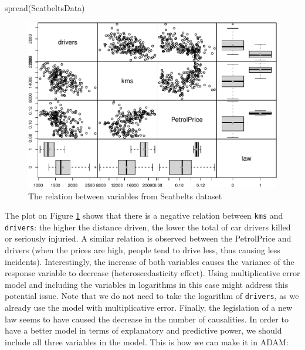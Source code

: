 \documentclass[
]{book}
\newenvironment{Shaded}{\begin{snugshade}}{\end{snugshade}}
\newcommand{\FunctionTok}[1]{\textcolor[rgb]{0.00,0.00,0.00}{#1}}
\newcommand{\NormalTok}[1]{#1}
\theoremstyle{definition}
\theoremstyle{definition}
\theoremstyle{definition}
\theoremstyle{definition}
\theoremstyle{remark}
\begin{document}
\begin{Shaded}
\begin{Highlighting}[]
\FunctionTok{spread}\NormalTok{(SeatbeltsData)}
\end{Highlighting}
\end{Shaded}

\begin{figure}
\centering
\includegraphics{adam_files/figure-latex/driversSpread-1.pdf}
\caption{\label{fig:driversSpread}The relation between variables from Seatbelts dataset}
\end{figure}

The plot on Figure \ref{fig:driversSpread} shows that there is a negative relation between \texttt{kms} and \texttt{drivers}: the higher the distance driven, the lower the total of car drivers killed or seriously injuried. A similar relation is observed between the PetrolPrice and drivers (when the prices are high, people tend to drive less, thus causing less incidents). Interestingly, the increase of both variables causes the variance of the response variable to decrease (heteroscedasticity effect). Using multiplicative error model and including the variables in logarithms in this case might address this potential issue. Note that we do not need to take the logarithm of \texttt{drivers}, as we already use the model with multiplicative error. Finally, the legislation of a new law seems to have caused the decrease in the number of causalities. In order to have a better model in terms of explanatory and predictive power, we should include all three variables in the model. This is how we can make it in ADAM:
\end{document}
